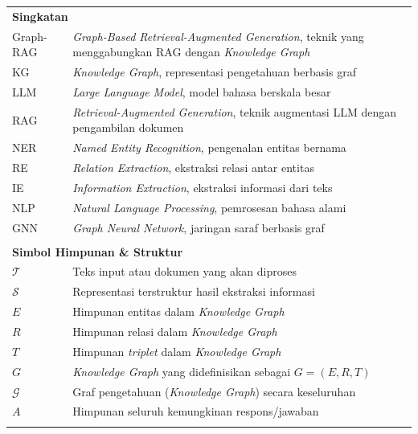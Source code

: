 \documentclass{SkripsiUnesa}
\begin{document}
\DaftarIsi
\DaftarTabel
\DaftarGambar
\DaftarSimbol
\renewcommand{\arraystretch}{1.3}
\begin{longtable}{p{} p{}}
    \multicolumn{2}{l}{\textbf{Singkatan}} \\[0.5em]
    Graph-RAG & \textit{Graph-Based Retrieval-Augmented Generation}, teknik yang menggabungkan RAG dengan \textit{Knowledge Graph} \\
    KG & \textit{Knowledge Graph}, representasi pengetahuan berbasis graf \\
    LLM & \textit{Large Language Model}, model bahasa berskala besar \\
    RAG & \textit{Retrieval-Augmented Generation}, teknik augmentasi LLM dengan pengambilan dokumen \\
    NER & \textit{Named Entity Recognition}, pengenalan entitas bernama \\
    RE & \textit{Relation Extraction}, ekstraksi relasi antar entitas \\
    IE & \textit{Information Extraction}, ekstraksi informasi dari teks \\
    NLP & \textit{Natural Language Processing}, pemrosesan bahasa alami \\
    GNN & \textit{Graph Neural Network}, jaringan saraf berbasis graf \\
    \\[0.5em]
    \multicolumn{2}{l}{\textbf{Simbol Himpunan \& Struktur}} \\[0.5em]
    $\mathcal{T}$ & Teks input atau dokumen yang akan diproses \\
    $\mathcal{S}$ & Representasi terstruktur hasil ekstraksi informasi \\
    $E$ & Himpunan entitas dalam \textit{Knowledge Graph} \\
    $R$ & Himpunan relasi dalam \textit{Knowledge Graph} \\
    $T$ & Himpunan \textit{triplet} dalam \textit{Knowledge Graph} \\
    $G$ & \textit{Knowledge Graph} yang didefinisikan sebagai $G = (E, R, T)$ \\
    $\mathcal{G}$ & Graf pengetahuan (\textit{Knowledge Graph}) secara keseluruhan \\
    $A$ & Himpunan seluruh kemungkinan respons/jawaban \\
    \\[0.5em]

\end{longtable}
\end{document}
